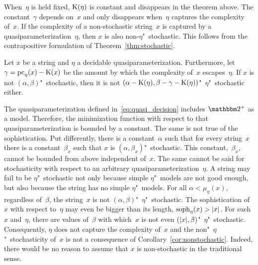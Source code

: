 When~$\eta$ is held fixed, $\operatorname{K}(\eta)$ is constant and disappears in the theorem above.
The constant~$\gamma$ depends on~$x$ and only disappears when~$\eta$ captures the complexity of~$x$.
If the complexity of a non-stochastic string~$x$ is captured by a quasiparameterization~$\eta$, then $x$ is also non-$\eta$"~stochastic.
This follows from the contrapositive formulation of Theorem~\ref{thm:stochastic}.
\begin{corollary}
\label{cor:nonstochastic}%
  Let $x$ be a string and $\eta$ a decidable quasiparameterization.
  Furthermore, let $\gamma = \operatorname{pc}_\eta(x) - \operatorname{K}(x)$ be the amount by which the complexity of~$x$ escapes~$\eta$.
  If $x$ is not $(\alpha, \beta)$"~stochastic, then it is not $(\alpha - \operatorname{K}(\eta), \beta - \gamma - \operatorname{K}(\eta))$"~$\eta$"~stochastic either.
\end{corollary}

The quasiparameterization defined in~\eqref{eq:quasi_decision} includes $\binary^+$ as a model.
Therefore, the minimization function with respect to that quasiparameterization is bounded by a constant.
The same is not true of the sophistication.
Put differently, there is a constant~$\alpha$ such that for every string~$x$ there is a constant~$\beta_x$ such that $x$ is $(\alpha, \beta_x)$"~stochastic.
This constant,~$\beta_x$, cannot be bounded from above independent of~$x$.
The same cannot be said for stochasticity with respect to an arbitrary quasiparameterization~$\eta$.
A string may fail to be $\eta$"~stochastic not only because simple $\eta$"~models are not good enough, but also because the string has no simple $\eta$"~models.
For all $\alpha < \mu_\eta(x)$, regardless of~$\beta$, the string~$x$ is not $(\alpha, \beta)$"~$\eta$"~stochastic.
The sophistication of~$x$ with respect to~$\eta$ may even be bigger than its length, $\operatorname{soph}_\eta(x) > {\lvert x\rvert}$.
For such~$x$ and~$\eta$, there are values of~$\beta$ with which~$x$ is not even $({\lvert x\rvert}, \beta)$"~$\eta$"~stochastic.
Consequently, $\eta$ does not capture the complexity of~$x$ and the non"~$\eta$"~stochasticity of~$x$ is not a consequence of Corollary~\ref{cor:nonstochastic}.
Indeed, there would be no reason to assume that $x$ is non-stochastic in the traditional sense.

